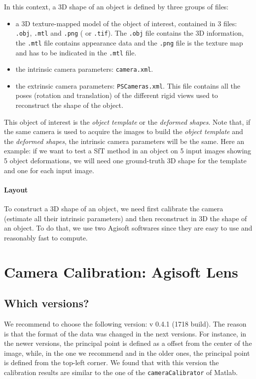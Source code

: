 \documentclass[11pt]{article}
\begin{document}
In this context, a 3D shape of an object is defined by three groups of files:
\begin{itemize}
\item a 3D texture-mapped model of the object of interest, contained in 3 files: {\tt .obj}, {\tt .mtl} and {\tt .png} ( or {\tt .tif}). The {\tt .obj} file contains the 3D information, the {\tt .mtl} file contains appearance data and the {\tt .png} file is the texture map and has to be indicated in the {\tt .mtl} file.
\item the intrinsic camera parameters: {\tt camera.xml}.
\item the extrinsic camera parameters: {\tt PSCameras.xml}. This file contains all the poses (rotation and translation) of the different rigid views used to reconstruct the shape of the object.
\end{itemize}
This object of interest is the \textit{object template} or the \textit{deformed shapes}.
Note that, if the same camera is used to acquire the images to build the \textit{object template} and the \textit{deformed shapes}, the intrinsic camera parameters will be the same.
Here an example: if we want to test a SfT method in an object on 5 input images showing 5 object deformations, we will need one ground-truth 3D shape for the template and one for each input image.

\paragraph{Layout}
To construct a 3D shape of an object, we need first calibrate the camera (\ie estimate all their intrinsic parameters) and then reconstruct in 3D the shape of an object. To do that, we use two Agisoft softwares since they are easy to use and reasonably fast to compute.

\section{Camera Calibration: Agisoft Lens}
\subsection{Which versions?}
We recommend to choose the following version: v 0.4.1 (1718 build).
The reason is that the format of the data was changed in the next versions.
For instance, in the newer versions, the principal point is defined as a offset from the center of the image, while, in the one we recommend and in the older ones, the principal point is defined from the top-left corner.
We found that with this version the calibration results are similar to the one of the {\tt cameraCalibrator} of Matlab.
\end{document}
